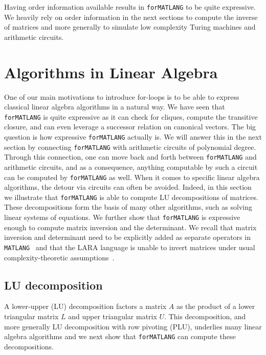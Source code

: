 \documentclass[sigconf]{acmart}
\newcommand{\lang}{\texttt{MATLANG}\xspace}
\newcommand{\langfor}{\texttt{for}\text{-}\texttt{MATLANG}\xspace}
\begin{document}
Having order information available results in \langfor to be quite expressive. We heavily rely on order information in the next sections to compute the inverse of matrices and more generally to simulate low complexity Turing machines and arithmetic circuits.

\section{Algorithms in Linear Algebra}\label{sec:queries}
One of our main motivations to introduce for-loops is to be able
to express classical linear algebra algorithms in a natural way. We have seen that \langfor is
quite expressive as it can check for cliques, compute the transitive closure, and can even
leverage a successor relation on canonical vectors. The big question is how expressive \langfor
actually is. We will answer this in the next section by connecting \langfor with 
arithmetic circuits of polynomial degree. Through this connection, one can move back and forth between \langfor and arithmetic circuits, and as a consequence, anything computable by such a circuit can be
computed by \langfor as well. When it comes to specific linear algebra algorithms, the detour via circuits
can often be avoided. Indeed, in this section we illustrate that \langfor is able to
compute LU decompositions of matrices. These decompositions form the basis of many other algorithms, such as solving linear systems of equations. We further show that \langfor is expressive enough to compute matrix inversion and the determinant. We recall that matrix inversion and determinant need to be explicitly added as separate operators in \lang~\cite{matlang-journal} and that the LARA language is unable to invert matrices under usual complexity-theoretic assumptions~\cite{BarceloH0S20}.

\subsection{LU decomposition}
A lower-upper (LU) decomposition factors a matrix $A$ as the product of a lower triangular matrix $L$ and upper triangular matrix $U$.  
This decomposition, and more generally LU decomposition with row pivoting (PLU),  underlies many linear algebra algorithms and 
we next show that \langfor can compute these decompositions.
\end{document}
